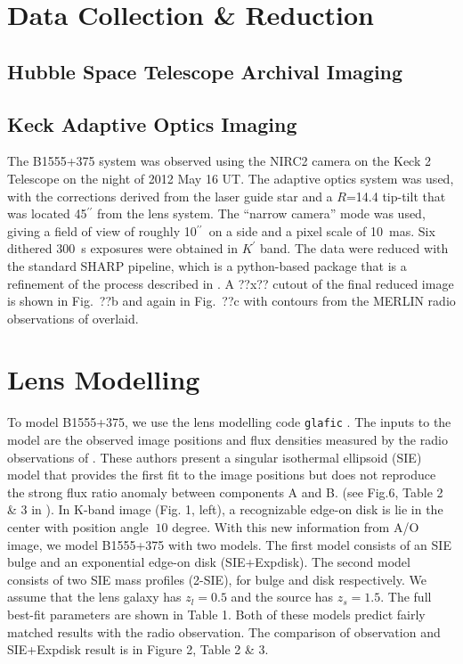 \documentclass[manuscript]{emulateapj}
\begin{document}
\section{Data Collection \& Reduction}

\subsection{Hubble Space Telescope Archival Imaging}

\subsection{Keck Adaptive Optics Imaging}

The B1555+375 system was observed using the NIRC2 camera on the Keck 2
Telescope on the night of 2012 May 16 UT.  The adaptive optics system
was used, with the corrections derived from the laser guide star and a
$R$=14.4 tip-tilt that was located 45$^{\prime\prime}$ from the lens
system.  The ``narrow camera'' mode was used, giving a field of view
of roughly 10$^{\prime\prime}$\ on a side and a pixel scale of 10~mas.
Six dithered 300~s exposures were obtained in $K^{\prime}$ band.  The
data were reduced with the standard SHARP pipeline, which is a
python-based package that is a refinement of the process described in
\citet{Auger_EELS1}.  A ??x?? cutout of the final reduced image
is shown in Fig.~??b and again in Fig.~??c with contours from the
MERLIN radio observations of \citet{Marlow} overlaid.  

\section{Lens Modelling}
To model B1555+375, we use the lens modelling code {\tt glafic}
\citep{Oguri}.  The inputs to the model are the observed image positions
and flux densities measured by the radio observations of \citet{Marlow}.
These authors present a singular isothermal ellipsoid (SIE) model that
provides the first fit to the image positions but
does not reproduce the strong flux ratio anomaly between components A and B.
(see Fig.6, Table 2 \& 3 in \citet{Marlow}). In K-band
image (Fig. 1, left), a recognizable edge-on disk is lie in the center
with position angle $~10$ degree. With this new information from A/O image, we model
B1555+375 with two models. The first model consists of an SIE bulge
and an exponential edge-on disk (SIE+Expdisk). The second model
consists of two SIE mass profiles (2-SIE), for bulge and disk
respectively. We assume that the lens galaxy has $z_{l}=0.5$ and the source has $z_s=1.5$. The full best-fit parameters are shown in Table 1. Both
of these models predict fairly matched results with the radio
observation. The comparison of observation and SIE+Expdisk result is
in Figure 2, Table 2 \& 3.
\end{document}
